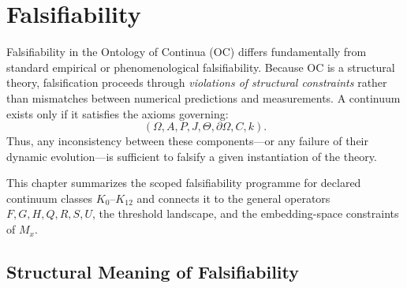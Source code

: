 

\section{Falsifiability}
\label{sec:falsifiability-master}

Falsifiability in the Ontology of Continua (OC) differs fundamentally
from standard empirical or phenomenological falsifiability.
Because OC is a structural theory, falsification proceeds through
\emph{violations of structural constraints} rather than mismatches
between numerical predictions and measurements.
A continuum exists only if it satisfies the axioms governing:
\[
(\Omega, A, P, J, \Theta, \partial\Omega, C, k).
\]
Thus, any inconsistency between these components—or any failure of
their dynamic evolution—is sufficient to falsify a given instantiation
of the theory.

This chapter summarizes the scoped falsifiability programme for
declared continuum classes $K_0$–$K_{12}$ and connects it to the general operators
$F, G, H, Q, R, S, U$, the threshold landscape, and the embedding-space
constraints of $M_x$.



\subsection{Structural Meaning of Falsifiability}

